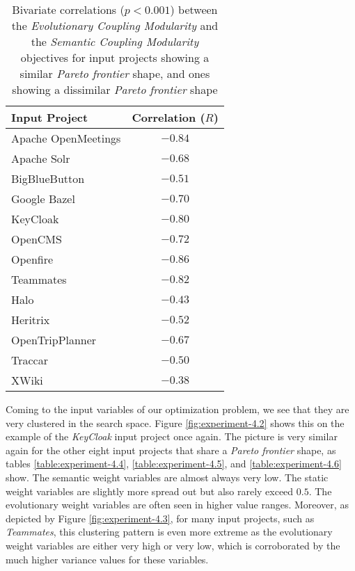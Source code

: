 \documentclass[12pt,a4paper]{report}
\begin{document}
\begin{table}[h!]
\def\arraystretch{1.55}
\begin{tabularx}{\textwidth}{|X|c|}
\hline
Input Project & Correlation ($R$) \\
\hline\hline

Apache OpenMeetings & $-0.84$  \\\hline
Apache Solr         & $-0.68$  \\\hline
BigBlueButton       & $-0.51$  \\\hline
Google Bazel        & $-0.70$  \\\hline
KeyCloak            & $-0.80$  \\\hline
OpenCMS             & $-0.72$  \\\hline
Openfire            & $-0.86$  \\\hline
Teammates           & $-0.82$  \\\hline
\hline\hline
Halo                & $-0.43$  \\\hline
Heritrix            & $-0.52$  \\\hline
OpenTripPlanner     & $-0.67$  \\\hline
Traccar             & $-0.50$  \\\hline
XWiki               & $-0.38$  \\\hline

\end{tabularx}
\caption{Bivariate correlations ($p < 0.001$) between the \textit{Evolutionary Coupling Modularity} and the \textit{Semantic Coupling Modularity} objectives for input projects showing a similar \textit{Pareto frontier} shape, and ones showing a dissimilar \textit{Pareto frontier} shape}
\label{table:experiment-4.3}
\end{table}

Coming to the input variables of our optimization problem, we see that they are
very clustered in the search space. Figure \ref{fig:experiment-4.2} shows this
on the example of the \textit{KeyCloak} input project once again.
The picture is very similar again for the other eight input projects that share
a \textit{Pareto frontier} shape, as tables \ref{table:experiment-4.4},
\ref{table:experiment-4.5}, and \ref{table:experiment-4.6} show.
The semantic weight variables are almost always very low. The static
weight variables are slightly more spread out but also rarely exceed $0.5$.
The evolutionary weight variables are often seen in higher value ranges.
Moreover, as depicted by Figure \ref{fig:experiment-4.3}, for many input
projects, such as \textit{Teammates}, this clustering pattern is even more
extreme as the evolutionary weight variables are either very high or very low,
which is corroborated by the much higher variance values for these variables.
\end{document}
